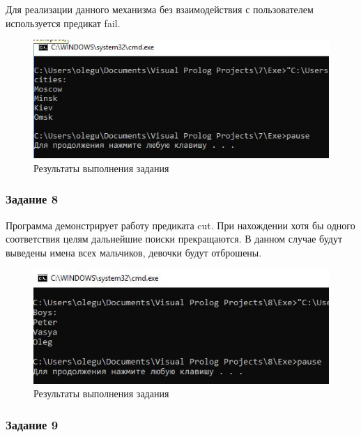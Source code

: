 \documentclass[14pt,a4paper,report]{report}
\begin{document}
Для реализации данного механизма без взаимодействия с пользователем используется предикат fail. 





\begin{figure}[h!]
	\centering
	\includegraphics[scale = 0.9]{images/d7.png}
	\caption{Результаты выполнения задания}
\end{figure}
\clearpage
\subsubsection{Задание 8}

Программа демонстрирует работу предиката cut. При нахождении хотя бы одного соответствия целям дальнейшие поиски прекращаются. В данном случае будут выведены имена всех мальчиков, девочки будут отброшены. 





\begin{figure}[h!]
	\centering
	\includegraphics[scale = 0.9]{images/d8.png}
	\caption{Результаты выполнения задания}
\end{figure}
\clearpage
\subsubsection{Задание 9}
\end{document}
